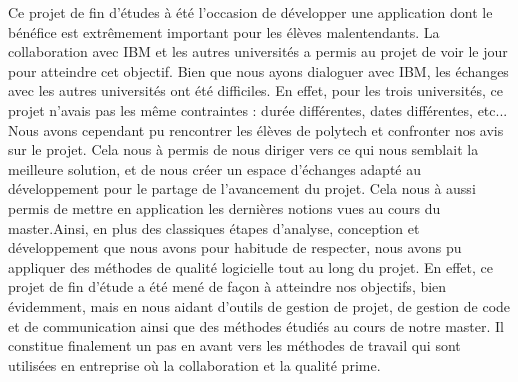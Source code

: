 \documentclass[a4paper,11pt]{report}
\begin{document}
Ce projet de fin d'études à été l'occasion de développer une application dont le bénéfice est extrêmement important pour les élèves malentendants. La collaboration avec IBM et les autres universités a permis au projet de voir le jour pour atteindre cet objectif. Bien que nous ayons dialoguer avec IBM, les échanges avec les autres universités ont été difficiles. En effet, pour les trois universités, ce projet n'avais pas les même contraintes : durée différentes, dates différentes, etc...
Nous avons cependant pu rencontrer les élèves de polytech et confronter nos avis sur le projet. Cela nous à permis de nous diriger vers ce qui nous semblait la meilleure solution, et de nous créer un espace d'échanges adapté au développement pour le partage de l'avancement du projet.
\medskip
Cela nous à aussi permis de mettre en application les dernières notions vues au cours du master.Ainsi, en plus des classiques étapes d'analyse, conception et développement que nous avons pour habitude de respecter, nous avons pu appliquer des méthodes de qualité logicielle tout au long du projet. En effet, ce projet de fin d'étude a été mené de façon à atteindre nos objectifs, bien évidemment, mais en nous aidant d'outils de gestion de projet, de gestion de code et de communication ainsi que des méthodes étudiés au cours de notre master.
\medskip
Il constitue finalement un pas en avant vers les méthodes de travail qui sont utilisées en entreprise où la collaboration et la qualité prime.


\listoffigures   


\end{document}
